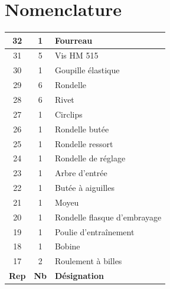 \documentclass[11pt,oneside]{article}
\begin{document}
\section*{Nomenclature}
\begin{minipage}[c]{.46\linewidth}
\begin{center}
\begin{tabular}{|c|c|p{6cm}|}
\hline 
32 &1& Fourreau \\ \hline
31 &5 &Vis HM 515 \\ \hline
30 &1 &Goupille élastique \\ \hline
29 &6 &Rondelle \\ \hline
28 &6 &Rivet \\ \hline
27 &1 &Circlips \\ \hline
26 &1 &Rondelle butée \\ \hline
25 &1 &Rondelle ressort \\ \hline
24 &1 &Rondelle de réglage \\ \hline
23 &1 &Arbre d'entrée \\ \hline
22 &1 &Butée à aiguilles \\ \hline
21 &1 &Moyeu \\ \hline
20 &1 &Rondelle flasque d'embrayage \\ \hline
19 &1 &Poulie d'entraînement \\ \hline
18 &1 &Bobine \\ \hline
17 &2 &Roulement à billes \\ \hline
\textbf{Rep} & \textbf{Nb} & \textbf{Désignation} \\ \hline
\end{tabular}
\end{center}
\end{minipage}\hfill
\end{document}
